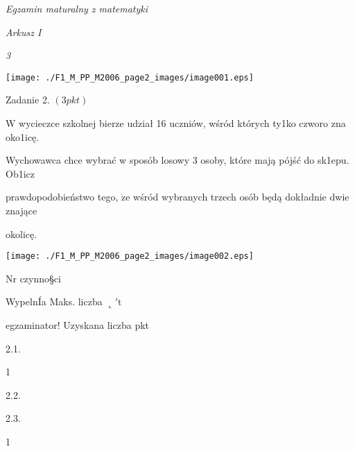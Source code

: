 \documentclass[a4paper,12pt]{article}
\begin{document}
{\it Egzamin maturalny z matematyki}

{\it Arkusz I}

{\it 3}
\begin{center}
\texttt{[image: ./F1\_M\_PP\_M2006\_page2\_images/image001.eps]}
\end{center}
Zadanie 2. $(3pkt)$

$\mathrm{W}$ wycieczce szkolnej bierze udział 16 uczniów, wśród których ty1ko czworo zna oko1icę.

Wychowawca chce wybrać w sposób losowy 3 osoby, które mają pójść do sk1epu. Ob1icz

prawdopodobieństwo tego, $\dot{\mathrm{z}}\mathrm{e}$ wśród wybranych trzech osób będą dokładnie dwie znające

okolicę.
\begin{center}
\texttt{[image: ./F1\_M\_PP\_M2006\_page2\_images/image002.eps]}
\end{center}
Nr czynno\S ci

WypelnÍa Maks. liczba $\llcorner\prime \mathrm{t}$

egzaminator! Uzyskana liczba pkt

2.1.

1

2.2.

2.3.

1
\end{document}
